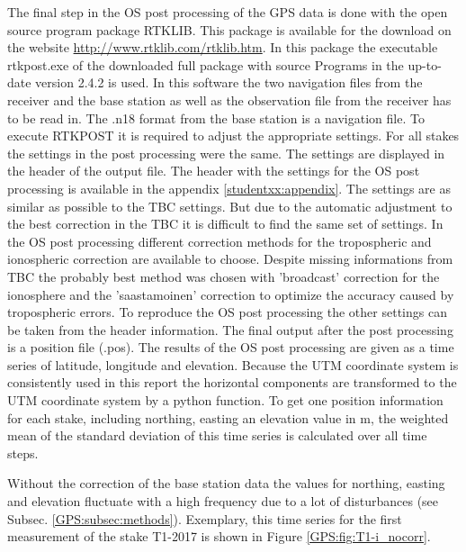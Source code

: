 The final step in the OS post processing of the GPS data is done with the open source program package RTKLIB.
This package is available for the download on the website \url{http://www.rtklib.com/rtklib.htm}.
In this package the executable rtkpost.exe of the downloaded full package with source Programs in the up-to-date version 2.4.2 is used.
In this software the two navigation files from the receiver and the base station as well as the observation file from the receiver has to be read in.
The .n18 format from the base station is a navigation file.
To execute RTKPOST it is required to adjust the appropriate settings.
For all stakes the settings in the post processing were the same.
The settings are displayed in the header of the output file.
The header with the settings for the OS post processing is available in the appendix \ref{studentxx:appendix}.
The settings are as similar as possible to the TBC settings.
But due to the automatic adjustment to the best correction in the TBC it is difficult to find the same set of settings.
In the OS post processing different correction methods for the tropospheric and ionospheric correction are available to choose. 
Despite missing informations from TBC the probably best method was chosen with 'broadcast' correction for the ionosphere and the 'saastamoinen' correction to optimize the accuracy caused by tropospheric errors. 
To reproduce the OS post processing the other settings can be taken from the header information. 
The final output after the post processing is a position file (.pos). 
The results of the OS post processing are given as a time series of latitude, longitude and elevation.
Because the UTM coordinate system is consistently used in this report the horizontal components are transformed to the UTM coordinate system by a python function.
To get one position information for each stake, including northing, easting an elevation value in m, the weighted mean of the standard deviation of this time series is calculated over all time steps.

Without the correction of the base station data the values for northing, easting and elevation fluctuate with a high frequency due to a lot of disturbances (see Subsec. \ref{GPS:subsec:methods}). 
Exemplary, this time series for the first measurement of the stake T1-2017 is shown in Figure \ref{GPS:fig:T1-i_nocorr}.

